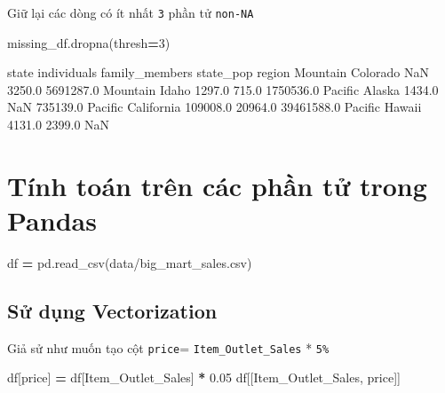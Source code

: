 \documentclass[
]{book}
\newenvironment{Shaded}{\begin{snugshade}}{\end{snugshade}}
\newcommand{\DecValTok}[1]{\textcolor[rgb]{0.00,0.00,0.81}{#1}}
\newcommand{\FloatTok}[1]{\textcolor[rgb]{0.00,0.00,0.81}{#1}}
\newcommand{\NormalTok}[1]{#1}
\newcommand{\OperatorTok}[1]{\textcolor[rgb]{0.81,0.36,0.00}{\textbf{#1}}}
\newcommand{\StringTok}[1]{\textcolor[rgb]{0.31,0.60,0.02}{#1}}
\begin{document}
Giữ lại các dòng có ít nhất \texttt{3} phần tử \texttt{non-NA}

\begin{Shaded}
\begin{Highlighting}[]
\NormalTok{missing\_df.dropna(thresh}\OperatorTok{=}\DecValTok{3}\NormalTok{)}
\end{Highlighting}
\end{Shaded}

\begin{Shaded}
\begin{Highlighting}[]
\NormalTok{               state  individuals  family\_members   state\_pop}
\NormalTok{region                                                       }
\NormalTok{Mountain    Colorado          NaN          3250.0   5691287.0}
\NormalTok{Mountain       Idaho       1297.0           715.0   1750536.0}
\NormalTok{Pacific       Alaska       1434.0             NaN    735139.0}
\NormalTok{Pacific   California     109008.0         20964.0  39461588.0}
\NormalTok{Pacific       Hawaii       4131.0          2399.0         NaN}
\end{Highlighting}
\end{Shaded}

\chapter{Tính toán trên các phần tử trong Pandas}\label{tuxednh-touxe1n-truxean-cuxe1c-phux1ea7n-tux1eed-trong-pandas}

\begin{Shaded}
\begin{Highlighting}[]
\NormalTok{df }\OperatorTok{=}\NormalTok{ pd.read\_csv(}\StringTok{\textquotesingle{}data/big\_mart\_sales.csv\textquotesingle{}}\NormalTok{)}
\end{Highlighting}
\end{Shaded}

\section{Sử dụng Vectorization}\label{sux1eed-dux1ee5ng-vectorization}

Giả sử như muốn tạo cột \texttt{price}= \texttt{Item\_Outlet\_Sales} * \texttt{5\%}

\begin{Shaded}
\begin{Highlighting}[]
\NormalTok{df[}\StringTok{\textquotesingle{}price\textquotesingle{}}\NormalTok{] }\OperatorTok{=}\NormalTok{ df[}\StringTok{\textquotesingle{}Item\_Outlet\_Sales\textquotesingle{}}\NormalTok{] }\OperatorTok{*} \FloatTok{0.05}
\NormalTok{df[[}\StringTok{\textquotesingle{}Item\_Outlet\_Sales\textquotesingle{}}\NormalTok{, }\StringTok{\textquotesingle{}price\textquotesingle{}}\NormalTok{]]}
\end{Highlighting}
\end{Shaded}
\end{document}
